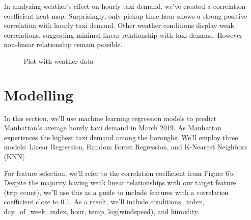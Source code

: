 \documentclass[11pt]{article}
\begin{document}
In analyzing weather's effect on hourly taxi demand, we've created a correlation coefficient heat map. Surprisingly, only pickup time hour shows a strong positive correlation with hourly taxi demand. Other weather conditions display weak correlations, suggesting minimal linear relationship with taxi demand. However non-linear relationship remain possible.
\begin{figure}[h]
    \hfill
    \centering
    \caption{Plot with weather data} %
\end{figure}



\section{Modelling}
In this section, we'll use machine learning regression models to predict Manhattan's average hourly taxi demand in March 2019. As Manhattan experiences the highest taxi demand among the boroughs. We'll employ three models: Linear Regression, Random Forest Regression, and K-Nearest Neighbors (KNN)

For feature selection, we'll refer to the correlation coefficient from Figure 6b. Despite the majority having weak linear relationships with our target feature (trip count), we'll use this as a guide to include features with a correlation coefficient close to 0.1. As a result, we'll include conditions\_index, day\_of\_week\_index, hour, temp, log(windspeed), and humidity.
\end{document}
